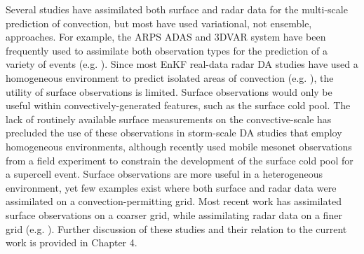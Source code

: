 Several studies have assimilated both surface and radar data for the multi-scale prediction of convection, but most have used variational, not ensemble, approaches. For example, the ARPS ADAS and 3DVAR system have been frequently used to assimilate both observation types for the prediction of a variety of events (e.g. \citealt{dawsonxue06,huetal07,schenkmanetal11}). Since most EnKF real-data radar DA studies have used a homogeneous environment to predict isolated areas of convection (e.g. \citealt{dowelletal11,dawsonetal12}), the utility of surface observations is limited. Surface observations would only be useful within convectively-generated features, such as the surface cold pool. The lack of routinely available surface measurements on the convective-scale has precluded the use of these observations in storm-scale DA studies that employ homogeneous environments, although recently \citet{marquisetal14} used mobile mesonet observations from a field experiment to constrain the development of the surface cold pool for a supercell event. Surface observations are more useful in a heterogeneous environment, yet few examples exist where both surface and radar data were assimilated on a convection-permitting grid. Most recent work has assimilated surface observations on a coarser grid, while assimilating radar data on a finer grid (e.g. \citealt{yussouf13}). Further discussion of these studies and their relation to the current work is provided in Chapter 4.


